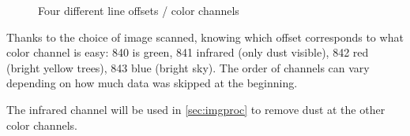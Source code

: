 \documentclass{article}
\begin{document}
\begin{figure}[H]
    \centering
     \quad
    
     \quad
    \caption{Four different line offsets / color channels}
\end{figure}

Thanks to the choice of image scanned, knowing which offset corresponds to what color channel
is easy: 840 is green, 841 infrared (only dust visible), 842 red (bright yellow trees), 843 blue (bright sky).
The order of channels can vary depending on how much data was skipped at the beginning.

The infrared channel will be used in \autoref{sec:imgproc} to remove dust at the other color channels.
\end{document}
